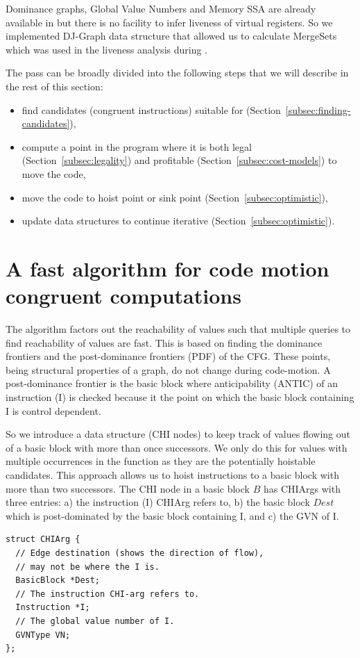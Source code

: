 \documentclass[sigplan,10pt,review,anonymous]{acmart}\settopmatter{printfolios=true,printccs=false,printacmref=false}
\begin{document}
Dominance graphs, Global Value Numbers and Memory SSA are already available in
\LLVM{} but there is no facility to infer liveness of virtual registers. So we
implemented DJ-Graph data structure that allowed us to calculate MergeSets which
was used in the liveness analysis during \GCM{}.

The \GCM{} pass can be broadly divided into the following steps that we will
describe in the rest of this section:
\begin{itemize}[leftmargin=*,topsep=0pt]
\item find candidates (congruent instructions) suitable for \gcm{}
  (Section~\ref{subsec:finding-candidates}),
\item compute a point in the program where it is both legal
  (Section~\ref{subsec:legality}) and profitable
  (Section~\ref{subsec:cost-models}) to move the code,
\item move the code to hoist point or sink point
  (Section~\ref{subsec:optimistic}),
\item update data structures to continue iterative \gcm{} (Section~\ref{subsec:optimistic}).
\end{itemize}

\section{A fast algorithm for code motion congruent computations}
The algorithm factors out the reachability of values such that multiple queries
to find reachability of values are fast. This is based on finding the dominance
frontiers and the post-dominance frontiers (PDF) of the CFG. These points, being
structural properties of a graph, do not change during code-motion. A
post-dominance frontier is the basic block where anticipability (ANTIC) of an
instruction (I) is checked because it the point on which the basic block
containing I is control dependent.

So we introduce a data structure (CHI nodes) to keep track of values flowing out
of a basic block with more than once successors. We only do this for values with
multiple occurrences in the function as they are the potentially hoistable
candidates. This approach allows us to hoist instructions to a basic block with
more than two successors. The CHI node in a basic block $B$ has CHIArgs with
three entries: a) the instruction (I) CHIArg refers to, b) the basic block $Dest$
which is post-dominated by the basic block containing I, and c) the GVN of I.

\begin{verbatim}
struct CHIArg {
  // Edge destination (shows the direction of flow),
  // may not be where the I is.
  BasicBlock *Dest;
  // The instruction CHI-arg refers to.
  Instruction *I;
  // The global value number of I.
  GVNType VN;
};
\end{verbatim}
\end{document}
